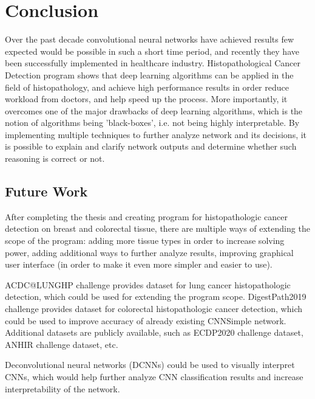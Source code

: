 \chapter{Conclusion}
\label{ch:sum}

Over the past decade convolutional neural networks have achieved results few expected would be possible in such a short time period, and recently they have been successfully implemented in healthcare industry. Histopathological Cancer Detection program shows that deep learning algorithms can be applied in the field of histopathology, and achieve high performance results in order reduce workload from doctors, and help speed up the process. More importantly, it overcomes one of the major drawbacks of deep learning algorithms, which is the notion of algorithms being 'black-boxes', i.e. not being highly interpretable. By implementing multiple techniques to further analyze network and its decisions, it is possible to explain and clarify network outputs and determine whether such reasoning is correct or not.

\section{Future Work}

After completing the thesis and creating program for histopathologic cancer detection on breast and colorectal tissue, there are multiple ways of extending the scope of the program: adding more tissue types in order to increase solving power, adding additional ways to further analyze results, improving graphical user interface (in order to make it even more simpler and easier to use).

ACDC@LUNGHP challenge provides dataset for lung cancer histopathologic detection, which could be used for extending the program scope. DigestPath2019 challenge provides dataset for colorectal histopathologic cancer detection, which could be used to improve accuracy of already existing CNNSimple network. Additional datasets are publicly available, such as ECDP2020 challenge dataset, ANHIR challenge dataset, etc.

Deconvolutional neural networks (DCNNs) could be used to visually interpret CNNs, which would help further analyze CNN classification results and increase interpretability of the network.
